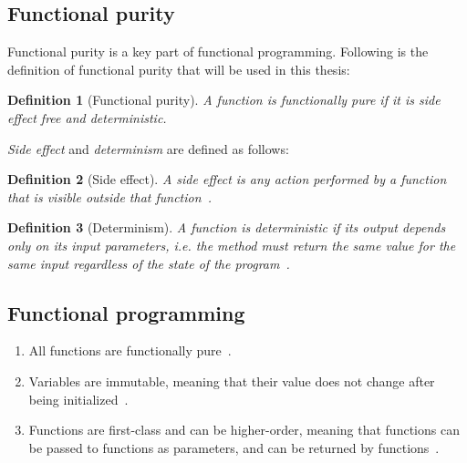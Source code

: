 \documentclass[a4paper,12pt]{article}
\newtheorem{definition}{Definition} %
\begin{document}
\subsection{Functional purity} \label{ssub:functional-purity-definition}

Functional purity is a key part of functional programming. Following is the definition of functional purity that will be used in this thesis:

\begin{definition}[Functional purity] \label{def:functional-purity}
  A function is functionally pure if it is \textit{side effect} free and \textit{deterministic}.
\end{definition}

\textit{Side effect} and \textit{determinism} are defined as follows:

\begin{definition}[Side effect] \label{def:side-effect}
  A side effect is any action performed by a function that is visible outside that function~\cite{purity-in-java}.
\end{definition}

\begin{definition}[Determinism] \label{def:determinism}
  A function is deterministic if its output depends only on its input parameters, i.e. the method must return the same value for the same input regardless of the state of the program~\cite{purity-in-java}.
\end{definition}

\subsection{Functional programming} \label{sub:functional-programming}

\begin{enumerate}
  \item All functions are functionally pure~\cite{alvin-alexander}.
  \item Variables are immutable, meaning that their value does not change after being initialized~\cite{alvin-alexander}. %
  \item Functions are first-class and can be higher-order, meaning that functions can be passed to functions as parameters, and can be returned by functions~\cite{jonas-walter}. %
\end{enumerate}
\end{document}
